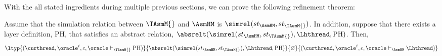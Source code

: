 With the all stated ingredients during multiple previous sections, we can prove the following refinement theorem:
\begin{theorem}
\begin{small}
Assume that the simulation relation between $\TAsmM{}$ and $\AsmHM$ is $\simrel(st_{\AsmHM}, st_{\TAsmM{}})$.
In addition, suppose that there exists a layer definition, $\mathrm{PH}$, that satisfies an abstract relation, 
$\absrelt(\simrel(st_{\AsmHM}, st_{\TAsmM{}}), \Lhthread, \mathrm{PH})$. Then,
$$\ltyp{(\curthread, \oracle^{t}, c, \oracle \vdash_{\TAsmM{}} \mathrm{PH})}
{\absrelt(\simrel(st_{\AsmHM}, st_{\TAsmM{}}), \Lhthread, \mathrm{PH})}
{\varnothing}{(\curthread, \oracle^{t}, c, \oracle \vdash_{\AsmHM} \Lhthread)}$$
\end{small}
\label{theorem:hasm-refines_tasm}
\end{theorem}%


